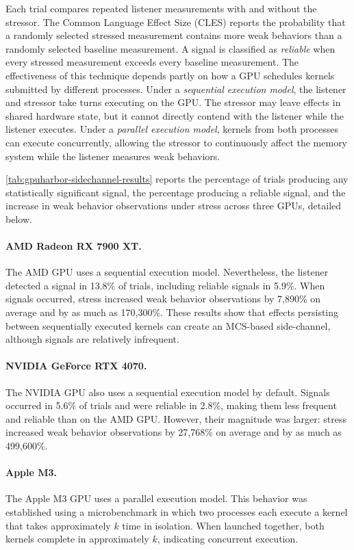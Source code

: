 Each trial compares repeated listener measurements with and without the stressor. The Common Language Effect Size (CLES) reports the probability that a randomly selected stressed measurement contains more weak behaviors than a randomly selected baseline measurement. A signal is classified as \textit{reliable} when every stressed measurement exceeds every baseline measurement. The effectiveness of this technique depends partly on how a GPU schedules kernels submitted by different processes. Under a \textit{sequential execution model}, the listener and stressor take turns executing on the GPU. The stressor may leave effects in shared hardware state, but it cannot directly contend with the listener while the listener executes. Under a \textit{parallel execution model}, kernels from both processes can execute concurrently, allowing the stressor to continuously affect the memory system while the listener measures weak behaviors.

\mytablong\ref{tab:gpuharbor-sidechannel-results} reports the percentage of trials producing any statistically significant signal, the percentage producing a reliable signal, and the increase in weak behavior observations under stress across three GPUs, detailed below.

\paragraph{AMD Radeon RX 7900 XT.}
The AMD GPU uses a sequential execution model. Nevertheless, the listener detected a signal in 13.8\% of trials, including reliable signals in 5.9\%. When signals occurred, stress increased weak behavior observations by 7,890\% on average and by as much as 170,300\%. These results show that effects persisting between sequentially executed kernels can create an MCS-based side-channel, although signals are relatively infrequent.

\paragraph{NVIDIA GeForce RTX 4070.}
The NVIDIA GPU also uses a sequential execution model by default. Signals occurred in 5.6\% of trials and were reliable in 2.8\%, making them less frequent and reliable than on the AMD GPU. However, their magnitude was larger: stress increased weak behavior observations by 27,768\% on average and by as much as 499,600\%.

\paragraph{Apple M3.}
The Apple M3 GPU uses a parallel execution model. This behavior was established using a microbenchmark in which two processes each execute a kernel that takes approximately $k$ time in isolation. When launched together, both kernels complete in approximately $k$, indicating concurrent execution.

